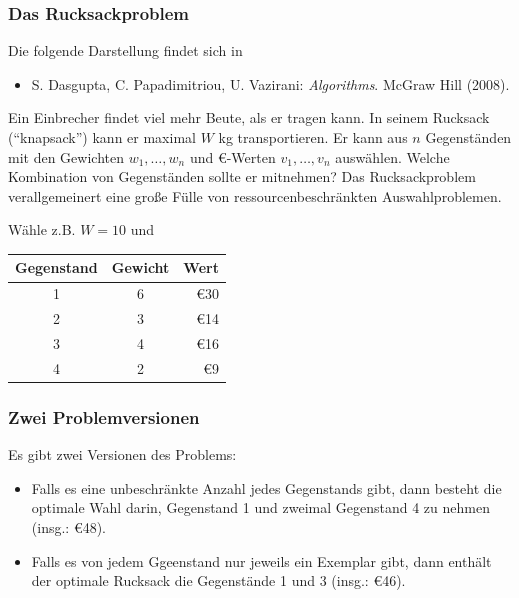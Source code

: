\documentclass[smaller]{beamer}
\begin{document}
\begin{frame}
 \frametitle{Das Rucksackproblem}
 Die folgende Darstellung findet sich in
\begin{itemize}
\item S. Dasgupta, C. Papadimitriou, U. Vazirani: \textit{Algorithms}. McGraw Hill (2008).
\end{itemize}

\bigskip


Ein Einbrecher findet viel mehr Beute, als er tragen kann. In seinem Rucksack (``knapsack'') kann er maximal $W$ kg transportieren. Er kann aus $n$ Gegenständen mit den Gewichten $w_1, \ldots, w_n$ und \euro-Werten $v_1, \ldots, v_n$ auswählen. Welche Kombination von Gegenständen sollte er mitnehmen? \alert{Das Rucksackproblem verallgemeinert eine große Fülle von ressourcenbeschränkten Auswahlproblemen.}

Wähle z.B. $W = 10$ und
\begin{center}
\begin{tabular}{c|cr}
Gegenstand & Gewicht & Wert \\ \hline
1 & 6 & \euro 30 \\
2 & 3 & \euro 14 \\
3 & 4 & \euro 16 \\
4 & 2 & \euro 9
\end{tabular}
\end{center}
\end{frame}

\begin{frame}
 \frametitle{Zwei Problemversionen}
 Es gibt \alert{zwei Versionen} des Problems:
 \begin{itemize}
 \item Falls es eine unbeschränkte Anzahl jedes Gegenstands gibt, dann besteht die optimale Wahl darin, Gegenstand 1 und zweimal Gegenstand 4 zu nehmen (insg.: \euro 48). 
 \item Falls es von jedem Ggeenstand nur jeweils ein Exemplar gibt, dann enthält der optimale Rucksack die Gegenstände 1 und 3 (insg.: \euro 46).
 \end{itemize}
\end{frame}
\end{document}
